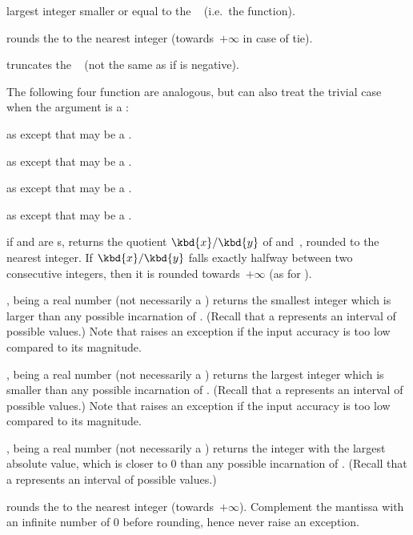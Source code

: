  largest integer smaller or equal to the
~ (i.e.~the  function).

 rounds the   to the nearest integer
(towards~$+\infty$ in case of tie).

 truncates the ~ (not the same as
 if  is negative).

The following four function are analogous, but can also treat the trivial
case when the argument is a :

as  except that  may be a .

as  except that  may be a .

as  except that  may be a .

as  except that  may be a .

 if  and  are s,
returns the quotient $\kbd{x}/\kbd{y}$ of  and~, rounded to
the nearest integer. If $\kbd{x}/\kbd{y}$ falls exactly halfway between
two consecutive integers, then it is rounded towards~$+\infty$ (as for
).

,  being a real number (not necessarily a
) returns the smallest integer which is larger than any possible
incarnation of . (Recall that a  represents an interval of
possible values.) Note that  raises an exception if the input
accuracy is too low compared to its magnitude.

,  being a real number (not necessarily a
) returns the largest integer which is smaller than any possible
incarnation of . (Recall that a  represents an interval of
possible values.) Note that  raises an exception if the input
accuracy is too low compared to its magnitude.

,  being a real number (not necessarily a
) returns the integer with the largest absolute value, which is closer
to $0$ than any possible incarnation of . (Recall that a 
represents an interval of possible values.)

 rounds the   to the nearest
integer (towards~$+\infty$). Complement the mantissa with an infinite number
of $0$ before rounding, hence never raise an exception.

